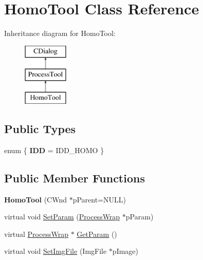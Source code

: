 \hypertarget{class_homo_tool}{}\section{Homo\+Tool Class Reference}
\label{class_homo_tool}
Inheritance diagram for Homo\+Tool\+:\begin{figure}[H]
\begin{center}
\leavevmode
\includegraphics[height=3.000000cm]{class_homo_tool}
\end{center}
\end{figure}
\subsection*{Public Types}
\begin{DoxyCompactItemize}
\item 
\mbox{\label{class_homo_tool_a14de69e679bae0adc7a2ebfabd62c878}} 
enum \{ {\bfseries I\+DD} = I\+D\+D\+\_\+\+H\+O\+MO
 \}
\end{DoxyCompactItemize}
\subsection*{Public Member Functions}
\begin{DoxyCompactItemize}
\item 
\mbox{\label{class_homo_tool_a9d149e537ecd9d22a6dea13a2ebfdfd3}} 
{\bfseries Homo\+Tool} (C\+Wnd $\ast$p\+Parent=N\+U\+LL)
\item 
virtual void \mbox{\hyperlink{class_homo_tool_a69965855ba23da88abe7903ad58c20c6}{Set\+Param}} (\mbox{\hyperlink{class_process_wrap}{Process\+Wrap}} $\ast$p\+Param)
\item 
virtual \mbox{\hyperlink{class_process_wrap}{Process\+Wrap}} $\ast$ \mbox{\hyperlink{class_homo_tool_a497eb4f1812d3f38ea6657c35d64bf31}{Get\+Param}} ()
\item 
virtual void \mbox{\hyperlink{class_homo_tool_af43fe8ae0732dffbeb35b59058509af2}{Set\+Img\+File}} (Img\+File $\ast$p\+Image)
\end{DoxyCompactItemize}
